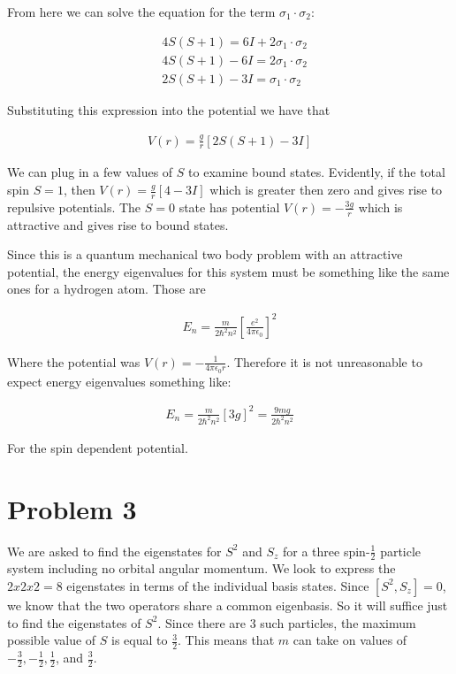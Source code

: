 \documentclass[paper=a4, fontsize=11pt]{scrartcl} %
\numberwithin{equation}{section} %
\numberwithin{figure}{section} %
\numberwithin{table}{section} %
\begin{document}
From here we can solve the equation for the term $\sigma_1 \cdot \sigma_2$:

\begin{align}
&4  S(S + 1) = 6I + 2 \sigma_1 \cdot \sigma_2 \\
&4  S(S + 1) - 6I = 2 \sigma_1 \cdot \sigma_2 \\
&2  S(S + 1) - 3I = \sigma_1 \cdot \sigma_2 
\end{align}

Substituting this expression into the potential we have that 

\begin{align}
V(r) = \frac{g}{r}\left[2 S(S+1) - 3I\right]
\end{align}

We can plug in a few values of $S$ to examine bound states. Evidently, if the total spin $S=1$, then $V(r) = \frac{g}{r}\left[4 - 3I\right]$ which is greater then zero and gives rise to repulsive potentials. The $S=0$ state has potential $V(r) = -\frac{3g}{r}$ which is attractive and gives rise to bound states. 



\hspace{2mm}

Since this is a quantum mechanical two body problem with an attractive potential, the energy eigenvalues for this system must be something like the same ones for a hydrogen atom. Those are 

\begin{align}
E_n = \frac{m}{2 \hbar^2 n^2} \left[\frac{e^2}{4 \pi \epsilon_0}\right]^2
\end{align}

Where the potential was $V(r) = -\frac{1}{4 \pi \epsilon_0 r}$. Therefore it is not unreasonable to expect energy eigenvalues something like:

\begin{align}
E_n = \frac{m}{2 \hbar^2 n^2}\left[3g\right]^2 = \frac{9 m g}{2 \hbar^2 n^2}
\end{align}

For the spin dependent potential.

\section{Problem 3}

We are asked to find the eigenstates for $S^2$ and $S_z$ for a three spin-$\frac{1}{2}$ particle system including no orbital angular momentum. We look to express the $2x2x2 = 8$ eigenstates in terms of the individual basis states. Since $[S^2, S_z] = 0$, we know that the two operators share a common eigenbasis. So it will suffice just to find the eigenstates of $S^2$. Since there are 3 such particles, the maximum possible value of $S$ is equal to $\frac{3}{2}$. This means that $m$ can take on values of $-\frac{3}{2}, -\frac{1}{2}, \frac{1}{2}$, and $\frac{3}{2}$.
\end{document}
